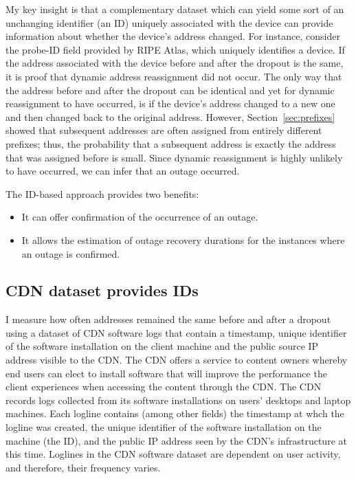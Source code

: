 My key insight is that a complementary dataset which can yield some
sort of an unchanging identifier (an ID) uniquely associated with the device
can provide information about whether the device's address
changed. For instance, consider the probe-ID field provided by RIPE
Atlas, which uniquely identifies a device. If the address associated
with the device before and after the dropout is the same, it is proof
that dynamic address reassignment did not occur. The only way that the
address before and after the dropout can be identical and yet for
dynamic reassignment to have occurred, is if the device's address
changed to a new one and then changed back to the original
address. However, Section~\ref{sec:prefixes} showed that subsequent
addresses are often assigned from entirely different prefixes; thus, the
probability that a subsequent address is exactly the address that was
assigned before is small. Since dynamic reassignment is highly
unlikely to have occurred, we can infer that an outage occurred. 

The ID-based approach provides two benefits:

\begin{itemize}

\item{It can offer confirmation of the occurrence of an outage.}

\item{It allows the estimation of outage recovery durations for the instances where an outage is confirmed.}

\end{itemize}


\subsection{CDN dataset provides IDs}

I measure how often addresses remained the same before and after a dropout using a dataset
of CDN software logs that contain a timestamp, unique identifier of
the software installation on the client machine and the public source
IP address visible to the CDN.  The CDN offers a service to content owners
whereby end users can elect to install software that will improve the
performance the client experiences when accessing the content through
the CDN. The CDN records logs collected from its software
installations on users' desktops and laptop machines. Each logline
contains (among other fields) the timestamp at whch the logline was
created, the unique identifier of the software installation on the
machine (the ID), and the public IP address seen by the CDN's
infrastructure at this time. Loglines in the CDN software dataset are
dependent on user activity, and therefore, their frequency varies. %

